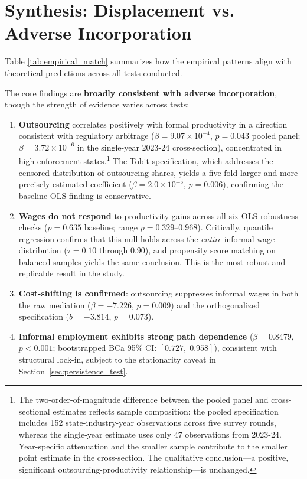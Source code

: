 \clearpage
\section{Synthesis: Displacement vs. Adverse Incorporation}
\label{sec:synthesis}

Table \ref{tab:empirical_match} summarizes how the empirical patterns align with theoretical predictions across all tests conducted.

%
	

The core findings are \textbf{broadly consistent with adverse incorporation}, though the strength of evidence varies across tests:

\begin{enumerate}
	\item \textbf{Outsourcing} correlates positively with formal productivity in a direction consistent with regulatory arbitrage ($\beta = 9.07 \times 10^{-4}$, $p=0.043$ pooled panel; $\beta = 3.72 \times 10^{-6}$ in the single-year 2023-24 cross-section), concentrated in high-enforcement states.\footnote{The two-order-of-magnitude difference between the pooled panel and cross-sectional estimates reflects sample composition: the pooled specification includes 152 state-industry-year observations across five survey rounds, whereas the single-year estimate uses only 47 observations from 2023-24. Year-specific attenuation and the smaller sample contribute to the smaller point estimate in the cross-section. The qualitative conclusion---a positive, significant outsourcing-productivity relationship---is unchanged.} The Tobit specification, which addresses the censored distribution of outsourcing shares, yields a five-fold larger and more precisely estimated coefficient ($\beta = 2.0 \times 10^{-5}$, $p = 0.006$), confirming the baseline OLS finding is conservative.
	\item \textbf{Wages do not respond} to productivity gains across all six OLS robustness checks ($p=0.635$ baseline; range $p=0.329$--$0.968$). Critically, quantile regression confirms that this null holds across the \textit{entire} informal wage distribution ($\tau = 0.10$ through $0.90$), and propensity score matching on balanced samples yields the same conclusion. This is the most robust and replicable result in the study.
	\item \textbf{Cost-shifting is confirmed}: outsourcing suppresses informal wages in both the raw mediation ($\beta = -7.226$, $p = 0.009$) and the orthogonalized specification ($b = -3.814$, $p = 0.073$).
	\item \textbf{Informal employment exhibits strong path dependence} ($\beta=0.8479$, $p<0.001$; bootstrapped BCa 95\% CI: $[0.727,\; 0.958]$), consistent with structural lock-in, subject to the stationarity caveat in Section~\ref{sec:persistence_test}.
\end{enumerate}

